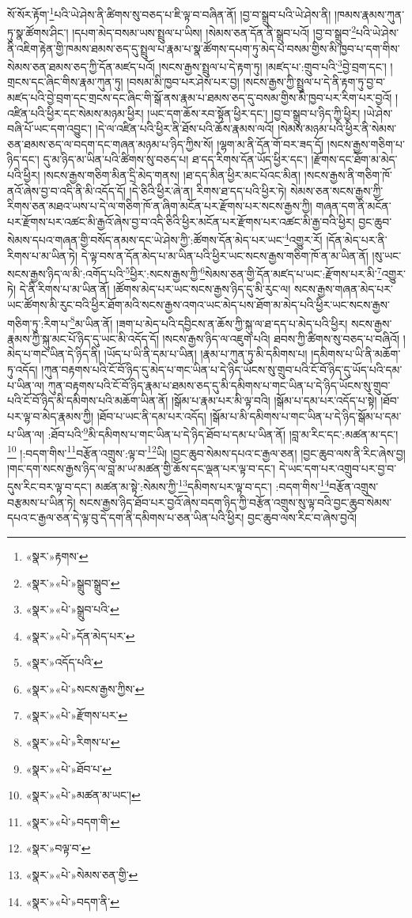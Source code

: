 སོ་སོར་རྟོག་\footnote{«སྣར་»རྟགས་}པའི་ཡེ་ཤེས་ནི་ཚིགས་སུ་བཅད་པ་ཇི་ལྟ་བ་བཞིན་ནོ། །བྱ་བ་སྒྲུབ་པའི་ཡེ་ཤེས་ནི། །ཁམས་རྣམས་ཀུན་ཏུ་སྣ་ཚོགས་ཤིང་། །དཔག་མེད་བསམ་ཡས་སྤྲུལ་པ་ཡིས། །སེམས་ཅན་དོན་ནི་སྒྲུབ་པའོ། །བྱ་བ་སྒྲུབ་\footnote{«སྣར་»«པེ་»སྒྲུབ་སྒྲུབ་}པའི་ཡེ་ཤེས་ནི་འཇིག་རྟེན་གྱི་ཁམས་ཐམས་ཅད་དུ་སྤྲུལ་པ་རྣམ་པ་སྣ་ཚོགས་དཔག་ཏུ་མེད་པ་བསམ་གྱིས་མི་ཁྱབ་པ་དག་གིས་སེམས་ཅན་ཐམས་ཅད་ཀྱི་དོན་མཛད་པའོ། །སངས་རྒྱས་སྤྲུལ་པ་དེ་རྟག་ཏུ། །མཛད་པ་:གྲུབ་པའི་\footnote{«སྣར་»«པེ་»སྒྲུབ་པའི་}བྱེ་བྲག་དང་། །གྲངས་དང་ཞིང་གིས་རྣམ་ཀུན་ཏུ། །བསམ་མི་ཁྱབ་པར་ཤེས་པར་བྱ། །སངས་རྒྱས་ཀྱི་སྤྲུལ་པ་དེ་ནི་རྟག་ཏུ་བྱ་བ་མཛད་པའི་བྱེ་བྲག་དང་གྲངས་དང་ཞིང་གི་སྒོ་ནས་རྣམ་པ་ཐམས་ཅད་དུ་བསམ་གྱིས་མི་ཁྱབ་པར་རིག་པར་བྱའོ། །འཛིན་པའི་ཕྱིར་དང་སེམས་མཉམ་ཕྱིར། །ཡང་དག་ཆོས་རབ་སྟོན་ཕྱིར་དང་། །བྱ་བ་སྒྲུབ་པ་ཉིད་ཀྱི་ཕྱིར། །ཡེ་ཤེས་བཞི་པོ་ཡང་དག་འབྱུང་། །དེ་ལ་འཛིན་པའི་ཕྱིར་ནི་ཐོས་པའི་ཆོས་རྣམས་ལའོ། །སེམས་མཉམ་པའི་ཕྱིར་ནི་སེམས་ཅན་ཐམས་ཅད་ལ་བདག་དང་གཞན་མཉམ་པ་ཉིད་ཀྱིས་སོ། །ལྷག་མ་ནི་དོན་གོ་བར་ཟད་དོ། །སངས་རྒྱས་གཅིག་པ་ཉིད་དང་། དུ་མ་ཉིད་མ་ཡིན་པའི་ཚིགས་སུ་བཅད་པ། ཐ་དད་རིགས་དོན་ཡོད་ཕྱིར་དང་། །རྫོགས་དང་ཐོག་མ་མེད་པའི་ཕྱིར། །སངས་རྒྱས་གཅིག་མིན་དྲི་མེད་གནས། །ཐ་དད་མིན་ཕྱིར་མང་པོའང་མིན། །སངས་རྒྱས་ནི་གཅིག་ཁོ་ནའོ་ཞེས་བྱ་བ་འདི་ནི་མི་འདོད་དོ། །དེ་ཅིའི་ཕྱིར་ཞེ་ན། རིགས་ཐ་དད་པའི་ཕྱིར་ཏེ། སེམས་ཅན་སངས་རྒྱས་ཀྱི་རིགས་ཅན་མཐའ་ཡས་པ་དེ་ལ་གཅིག་ཁོ་ན་ཞིག་མངོན་པར་རྫོགས་པར་སངས་རྒྱས་ཀྱི། གཞན་དག་ནི་མངོན་པར་རྫོགས་པར་འཚང་མི་རྒྱའོ་ཞེས་བྱ་བ་འདི་ཅིའི་ཕྱིར་མངོན་པར་རྫོགས་པར་འཚང་མི་རྒྱ་བའི་ཕྱིར། བྱང་ཆུབ་སེམས་དཔའ་གཞན་གྱི་བསོད་ནམས་དང་ཡེ་ཤེས་ཀྱི་:ཚོགས་དོན་མེད་པར་ཡང་\footnote{«སྣར་»«པེ་»དོན་མེད་པར་}འགྱུར་རོ། །དོན་མེད་པར་ནི་རིགས་པ་མ་ཡིན་ཏེ། དེ་ལྟ་བས་ན་དོན་མེད་པ་མ་ཡིན་པའི་ཕྱིར་ཡང་སངས་རྒྱས་གཅིག་ཁོ་ན་མ་ཡིན་ནོ། །སུ་ཡང་སངས་རྒྱས་ཉིད་ལ་མི་:འགོད་པའི་\footnote{«སྣར་»འདོད་པའི་}ཕྱིར་:སངས་རྒྱས་ཀྱི་\footnote{«སྣར་»«པེ་»སངས་རྒྱས་ཀྱིས་}སེམས་ཅན་གྱི་དོན་མཛད་པ་ཡང་:རྫོགས་པར་མི་\footnote{«སྣར་»«པེ་»རྫོགས་པར་}འགྱུར་ཏེ། དེ་ནི་རིགས་པ་མ་ཡིན་ནོ། །ཚོགས་མེད་པར་ཡང་སངས་རྒྱས་ཉིད་དུ་མི་རུང་ལ། སངས་རྒྱས་གཞན་མེད་པར་ཡང་ཚོགས་མི་རུང་བའི་ཕྱིར་ཐོག་མའི་སངས་རྒྱས་འགའ་ཡང་མེད་པས་ཐོག་མ་མེད་པའི་ཕྱིར་ཡང་སངས་རྒྱས་གཅིག་ཏུ་:རིག་པ་\footnote{«སྣར་»«པེ་»རིགས་པ་}མ་ཡིན་ནོ། །ཟག་པ་མེད་པའི་དབྱིངས་ན་ཆོས་ཀྱི་སྐུ་ལ་ཐ་དད་པ་མེད་པའི་ཕྱིར། སངས་རྒྱས་རྣམས་ཀྱི་སྐུ་མང་པོ་ཉིད་དུ་ཡང་མི་འདོད་དོ། །སངས་རྒྱས་ཉིད་ལ་འཇུག་པའི། ཐབས་ཀྱི་ཚིགས་སུ་བཅད་པ་བཞིའོ། །མེད་པ་གང་ཡིན་དེ་ཉིད་ནི། །ཡོད་པ་ཡི་ནི་དམ་པ་ཡིན། །རྣམ་པ་ཀུན་ཏུ་མི་དམིགས་པ། །དམིགས་པ་ཡི་ནི་མཆོག་ཏུ་འདོད། །ཀུན་བརྟགས་པའི་ངོ་བོ་ཉིད་དུ་མེད་པ་གང་ཡིན་པ་དེ་ཉིད་ཡོངས་སུ་གྲུབ་པའི་ངོ་བོ་ཉིད་དུ་ཡོད་པའི་དམ་པ་ཡིན་ལ། ཀུན་བརྟགས་པའི་ངོ་བོ་ཉིད་རྣམ་པ་ཐམས་ཅད་དུ་མི་དམིགས་པ་གང་ཡིན་པ་དེ་ཉིད་ཡོངས་སུ་གྲུབ་པའི་ངོ་བོ་ཉིད་མི་དམིགས་པའི་མཆོག་ཡིན་ནོ། །སྒོམ་པ་རྣམ་པར་མི་ལྟ་བའི། །སྒོམ་པ་དམ་པར་འདོད་པ་སྟེ། །ཐོབ་པར་ལྟ་བ་མེད་རྣམས་ཀྱི། །ཐོབ་པ་ཡང་ནི་དམ་པར་འདོད། །སྒོམ་པ་མི་དམིགས་པ་གང་ཡིན་པ་དེ་ཉིད་སྒོམ་པ་དམ་པ་ཡིན་ལ། :ཐོབ་པའི་\footnote{«སྣར་»«པེ་»ཐོབ་པ་}མི་དམིགས་པ་གང་ཡིན་པ་དེ་ཉིད་ཐོབ་པ་དམ་པ་ཡིན་ནོ། །བླ་མ་རིང་དང་:མཚན་མ་དང་།\footnote{«སྣར་»«པེ་»མཚན་མ་ཡང་།} །:བདག་གིས་\footnote{«སྣར་»«པེ་»བདག་གི་}བརྩོན་འགྲུས་:ལྟ་བ་\footnote{«སྣར་»བལྟ་བ་}ཡི། །བྱང་ཆུབ་སེམས་དཔའ་ང་རྒྱལ་ཅན། །བྱང་ཆུབ་ལས་ནི་རིང་ཞེས་བྱ། །གང་དག་སངས་རྒྱས་ཉིད་ལ་བླ་མ་ཡ་མཚན་གྱི་ཆོས་དང་ལྡན་པར་ལྟ་བ་དང་། དེ་ཡང་དག་པར་འགྲུབ་པར་བྱ་བ་དུས་རིང་བར་ལྟ་བ་དང་། མཚན་མ་སྟེ་:སེམས་ཀྱི་\footnote{«སྣར་»«པེ་»སེམས་ཅན་གྱི་}དམིགས་པར་ལྟ་བ་དང་། :བདག་གིས་\footnote{«སྣར་»«པེ་»བདག་ནི་}བརྩོན་འགྲུས་བརྩམས་པ་ཡིན་ཏེ། སངས་རྒྱས་ཉིད་ཐོབ་པར་བྱའོ་ཞེས་བདག་ཉིད་ཀྱི་བརྩོན་འགྲུས་སུ་ལྟ་བའི་བྱང་ཆུབ་སེམས་དཔའ་ང་རྒྱལ་ཅན་དེ་ལྟ་བུ་དེ་དག་ནི་དམིགས་པ་ཅན་ཡིན་པའི་ཕྱིར། བྱང་ཆུབ་ལས་རིང་བ་ཞེས་བྱའོ། 